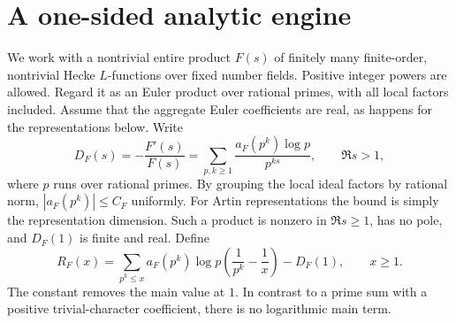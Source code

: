\documentclass[11pt]{article}
\theoremstyle{remark}\newtheorem{remark}[theorem]{Remark}
\begin{document}
\section{A one-sided analytic engine}
We work with a nontrivial entire product $F(s)$ of finitely many finite-order, nontrivial Hecke $L$-functions over fixed number fields. Positive integer powers are allowed. Regard it as an Euler product over rational primes, with all local factors included. Assume that the aggregate Euler coefficients are real, as happens for the representations below. Write
\[
D_F(s)=-\frac{F'(s)}{F(s)}=\sum_{p,k\ge1}\frac{a_F(p^k)\log p}{p^{ks}},\qquad \Re s>1,
\]
where $p$ runs over rational primes. By grouping the local ideal factors by rational norm, $|a_F(p^k)|\le C_F$ uniformly. For Artin representations the bound is simply the representation dimension. Such a product is nonzero in $\Re s\ge1$, has no pole, and $D_F(1)$ is finite and real. Define
\begin{equation}\label{eq:Rfull}
 R_F(x)=\sum_{p^k\le x}a_F(p^k)\log p\left(\frac1{p^k}-\frac1x\right)-D_F(1),\qquad x\ge1.
\end{equation}
The constant removes the main value at $1$. In contrast to a prime sum with a positive trivial-character coefficient, there is no logarithmic main term.
\end{document}
